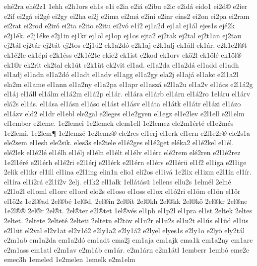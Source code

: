 {eh^^e92ra
eh^^e92z1
1ehh
e2h1ors
eh1s
e1i
e2ia
e2i^^e1
e2ibu
e2ic
e2id^^e1
eido1
ei2d^^ae
e2ier
e2if
ei2g^^e1
ei2g^^e9
ei2gy
ei2ha
ei2j
e2ima
ei2m^^e1
e2ini
e2inr
eins2
ei2on
ei2pa
ei2ram
ei2rat
ei2rod
e2ir^^f3
ei2ta
e2ito
e2itu
ei2v^^f3
e1^^ed2
ej1a2d
ej1al
ej1^^e1l
ejes1s
ej^^e92k
e2j1^^e9k.
e2j1^^e9ke
e2j1in
ej1kr
ej1ol
ej1op
ej1os
ejta2
ej2tak
ej2tal
ej2t1an
ej2tau
ej2t^^e1l
ej2t^^e1r
ej2t^^e1t
ej2tos
e2j1^^fa2
ek1a2d^^f3
e2k1aj
e2k1alj
ek1^^e1ll
ek1^^e1r.
e2k1e2l^^aet
ek1^^e92le
ek1^^e9p^^ed
e2k1^^e9ss
e2k1^^e92te
ekie2
ek1ist
e2kod
ek1orv
ek^^f62l
ek1^^f6l^^e9
ek1^^f6l^^ae
ek1^^aer
ek2rit
ek2tal
ek1^^fat
e2k1^^fct
ek2vit
el1ad.
el1a2da
el1a2d^^e1
el1add
el1adh
el1adj
el1adn
el1a2d^^f3
el1adt
el1adv
el1agg
el1a2gy
ela2j
el1aj^^e1
el1akc
e2l1a2l
ela2m
el1ame
el1ann
el1a2ny
el1a2pa
el1apr
el1asz^^e1
e2l1a2u
el1a2v
el1^^e1cs
e2l1^^e12g
el1^^e1j
el1^^e1ll
el1^^e1lm
el1^^e12m
el1^^e12p
el1^^e1r.
el1^^e1ra
el1^^e1rb
el1^^e1rn
el1^^e12ro
1el^^e1ru
el1^^e1rv
el^^e12s
el1^^e1s.
el1^^e1sa
el1^^e1sn
el1^^e1so
el1^^e1st
el1^^e1sv
el1^^e1ta
el1^^e1tk
el1^^e1tr
el1^^e1zi
el1^^e1zo
el1^^e1zv
eld2
el1dr
el1ebl
ele2gal
e2leges
el1e2gyen
el1egz
el1e2lev
e2l1ell
e2l1elm
el1ember
e2leme.
1e2lemei
1e2lemek
elem1ell
1e2lemez
ele2m1^^e9rt^^e9
el1e2m^^e9s
1e2lemi.
1e2lem^^b6
1e2lemz^^e9
1e2lemz^^ae
ele2res
el1erj
el1erk
el1ern
e2l1e2r^^ae
ele2s1a
ele2sem
el1esh
ele2sik.
eles3s
ele2tele
el1^^e92ges
el1^^e92get
el^^e9ka2
el1^^e92kel
el1^^e9l.
el^^e92lek
el1^^e92l^^e9
el1^^e9lh
el1^^e9lj
el1^^e9ln
el1^^e9lt
el1^^e9lv
el1^^e9rc
el^^e92rem
el^^e92ren
e2l1^^e92rez
1e2l1^^e9r^^e9
e2l1^^e9rh
el1^^e92ri
e2l1^^e9rj
e2l1^^e9rk
e2l1^^e9rn
el1^^e9rs
e2l1^^e9r^^fc
el1f2
el1iga
e2l1ige
2elik
el1ikr
el1ill
el1ina
e2l1ing
elin1n
elio1
eli2os
el1iv^^e1
1e2lix
el1izm
e2l1^^edn
el1^^edr.
el1^^edra
el1^^ed2r^^e1
e2l1^^ed2v
2elj.
el1k2
ell1alk
1ell^^e1t^^e1s^^fc
1ellens
ellu2s
1elm^^e9l
2eln^^e9
e2l1o2l
el1oml
el1orc
el1ord
elo2s
el1oso
el1oss
el1ox
el1^^f32ri
el1^^f6m
el1^^f6n
el1^^f6r
el1^^f62z
1e2l^^aead
2el^^aeb^^e9
1el^^aed.
2el^^aein
2el^^aeit
2el^^aekh
2el^^aekk
2el^^aek^^f6
2el^^aekr
2el^^aene
1e2l^^ae^^ae
2el^^aer
2el^^aet.
2el^^aeter
e2l^^aetet
1el^^aev^^e9s
el1ph
el1p2l
el1pra
el1st
2eltek
2eltes
2eltet.
2eltete
2eltet^^e9
2elteti
2eltetn
el2t^^f6v
el1u2r
el1u2s
el1u2t
el1^^fas
el1^^fcd
el1^^fcs
e2l1^^fct
el2val
el2v1at
el2v1^^f32
e2ly1a2
e2ly1^^e12
e2lyel
elyes1s
e2ly1o
e2ly^^f6
ely2t^^e1l
e2m1ab
em1a2da
em1a2d^^f3
em1adt
ema2j
em1aja
em1ajk
ema1k
em1a2ny
em1arc
e2m1ass
em1atl
e2m1av
e2m1^^e1b
em1^^e1r.
e2m1^^e1rn
e2m1^^e1tl
1emberr
1emb^^f3
eme2c
emec3h
1emeled
1e2melen
1emelk
e2m1elm
}
